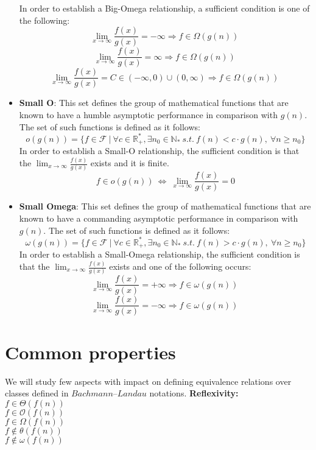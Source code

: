 \documentclass{article}
\begin{document}
\begin{itemize}
  
  In order to establish a Big-Omega relationship, a sufficient condition is one of the following:
    \[  \lim_{x\to\infty} \frac{f(x)}{g(x)} = -\infty \Rightarrow f \in \Omega(g(n))\ \]
    \[ \lim_{x\to\infty} \frac{f(x)}{g(x)} = \infty \Rightarrow f \in \Omega(g(n))\  \]
     \[ \lim_{x\to\infty} \frac{f(x)}{g(x)} = C \in (-\infty, 0) \cup (0,\infty) \Rightarrow f \in \Omega(g(n))\ \]

  \item \textbf{Small O}:
  This set defines the group of mathematical functions that are known to have a humble
 asymptotic performance in comparison with  $g(n)$. The set of such functions is defined as it follows:
  \[o(g(n)) = \lbrace f \in \mathcal{F}\ |\ \forall c \in \mathbb{R}^{*}_{+}, \exists n_{0} \in \mathbb{N}_{*}\ s.t.\  f(n) < c \cdot g(n),\  \forall n \geq n_{0} \rbrace\]
In order to establish a Small-O relationship, the sufficient condition is that the $ \lim_{x\to\infty} \frac{f(x)}{g(x)}$ exists and it is finite. 
  \[ f \in o(g(n))\ \Leftrightarrow\ \lim_{x\to\infty} \frac{f(x)}{g(x)} = 0 \]  
  
  \item \textbf{Small Omega}:
  This set defines the group of mathematical functions that are known to have a commanding asymptotic performance in comparison with  $g(n)$.
  The set of such functions is defined as it follows:
  \[\omega(g(n)) = \lbrace f \in \mathcal{F}\ |\ \forall c \in \mathbb{R}^{*}_{+}, \exists n_{0} \in \mathbb{N}_{*}\ s.t.\  f(n) > c \cdot g(n),\  \forall n \geq n_{0} \rbrace\]
In order to establish a Small-Omega relationship, the sufficient condition is that the $ \lim_{x\to\infty} \frac{f(x)}{g(x)}$ exists and one of the following occurs:
  \[  \lim_{x\to\infty} \frac{f(x)}{g(x)} = +\infty \Rightarrow f \in \omega(g(n))\ \]   
  \[  \lim_{x\to\infty} \frac{f(x)}{g(x)} = -\infty \Rightarrow f \in \omega(g(n))\ \]  
  
\end{itemize}

\section{Common properties}
We will study few aspects with impact on defining equivalence relations over classes defined in $Bachmann–Landau$ notations$.$
 \hfill\break
 \hfill\break
 \textbf{Reflexivity:}  \\  $ f \in \Theta(f(n)) $ \\$ f \in \mathcal{O}(f(n)) $ \\$ f \in \Omega(f(n)) $
 \\$ f \notin \theta(f(n)) $ \\$ f \notin \omega(f(n)) $ 
 \hfill\break
\end{document}
